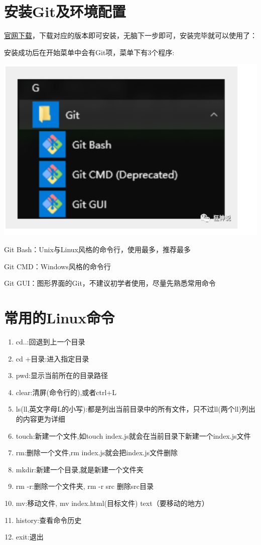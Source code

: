 \documentclass{article}
\begin{document}
\section{安装Git及环境配置}

\href{https://git-scm.com/download/win}{官网下载}，下载对应的版本即可安装，无脑下一步即可，安装完毕就可以使用了：

安装成功后在开始菜单中会有Git项，菜单下有3个程序:

\centering
\includegraphics{image/4.1.png}
\begin{flushleft}
Git Bash：Unix与Linux风格的命令行，使用最多，推荐最多

Git CMD：Windows风格的命令行

Git GUI：图形界面的Git，不建议初学者使用，尽量先熟悉常用命令  
\end{flushleft}


\section{常用的Linux命令}
  
\begin{enumerate}
\renewcommand{\labelenumi}{\arabic{enumi}.}%
    \item cd..:回退到上一个目录
    \item cd +目录:进入指定目录
    \item pwd:显示当前所在的目录路径
    \item clear:清屏(命令行的),或者ctrl+L
    \item ls(ll,英文字母L的小写):都是列出当前目录中的所有文件，只不过ll(两个ll)列出的内容更为详细
    \item touch:新建一个文件,如touch index.js就会在当前目录下新建一个index.js文件
    \item rm:删除一个文件,rm index.js就会把index.js文件删除
    \item mkdir:新建一个目录,就是新建一个文件夹
    \item rm -r:删除一个文件夹, rm -r src 删除src目录
    \item mv:移动文件, mv index.html(目标文件) text（要移动的地方）
    \item history:查看命令历史
    \item exit:退出
\end{enumerate}
\end{document}
